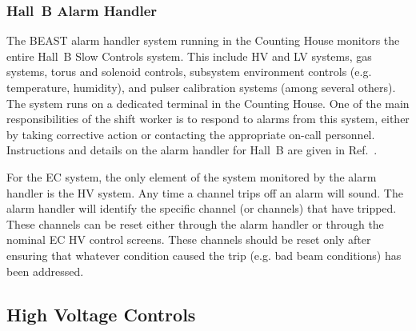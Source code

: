\documentclass[letterpaper,10pt]{article}
\begin{document}
\subsubsection{Hall~B Alarm Handler}
\label{alarms}

The BEAST alarm handler system running in the Counting House monitors the entire Hall~B Slow Controls
system. This include HV and LV systems, gas systems, torus and solenoid controls, subsystem
environment controls (e.g. temperature, humidity), and pulser calibration systems (among several
others). The system runs on a dedicated terminal in the Counting House. One of the main responsibilities
of the shift worker is to respond to alarms from this system, either by taking corrective action
or contacting the appropriate on-call personnel. Instructions and details on the alarm handler for Hall~B
are given in Ref.~\cite{beast}.

For the EC system, the only element of the system monitored by the alarm handler is the HV system.
Any time a channel trips off an alarm will sound. The alarm handler will identify the specific
channel (or channels) that have tripped. These channels can be reset either through the alarm handler
or through the nominal EC HV control screens. These channels should be reset only after ensuring
that whatever condition caused the trip (e.g. bad beam conditions) has been addressed.

\subsection{High Voltage Controls}
\label{hv-control}
\end{document}
